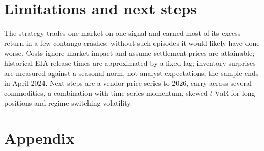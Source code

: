 \documentclass[10pt,a4paper]{article}
\begin{document}
\section{Limitations and next steps}
The strategy trades one market on one signal and earned most of its excess return in a few contango crashes; without such episodes it would likely have done worse. Costs ignore market impact and assume settlement prices are attainable; historical EIA release times are approximated by a fixed lag; inventory surprises are measured against a seasonal norm, not analyst expectations; the sample ends in April 2024. Next steps are a vendor price series to 2026, carry across several commodities, a combination with time-series momentum, skewed-$t$ VaR for long positions and regime-switching volatility.

{\small
\setlength{\bibsep}{1pt plus 0.3pt}

}

\clearpage
\appendix
\section*{Appendix}
\renewcommand{\thetable}{A\arabic{table}}
\renewcommand{\thefigure}{A\arabic{figure}}
\setcounter{table}{0}
\setcounter{figure}{0}
\end{document}
